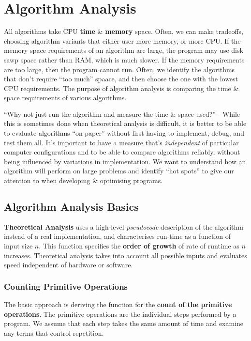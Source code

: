 \documentclass[11pt]{article}
\begin{document}
\section{Algorithm Analysis}
All algorithms take CPU \textbf{time} \& \textbf{memory} space. 
Often, we can make tradeoffs, choosing algorithm variants that either user more memory, or more CPU. 
If the memory space requirements of an algorithm are large, the program may use disk sawp space rather than RAM, which is much slower. 
If the memory requirements are too large, then the program cannot run. 
Often, we identify the algorithms that don't require ``too much'' spaace, and then choose the one with the lowest 
CPU requirements. 
The purpose of algorithm analysis is comparing the time \& space requirements of various algorithms. 

``Why not just run the algorithm and measure the time \& space used?'' - 
While this is sometimes done when theoretical analysis is difficult, it is better to be able to evaluate 
algorithms ``on paper'' without first having to implement, debug, and test them all.
It's important to have a measure that's \textit{independent} of particular computer configurations and to be able to  
compare algorithms reliably, without being influenced by variations in implementation. 
We want to understand how an algorithm will perform on large problems and identify ``hot spots'' to give our attention 
to when developing \& optimising programs. 

\subsection{Algorithm Analysis Basics}
\textbf{Theoretical Analysis} uses a high-level \textit{pseudocode} description of the algorithm instead of a real 
implementation, and characterises run-time as a function of input size $n$. 
This function specifies the \textbf{order of growth} of rate of runtime as $n$ increases. 
Theoretical analysis takes into account all possible inputs and evaluates speed independent of hardware or software. 

\subsubsection{Counting Primitive Operations}
The basic approach is deriving the function for the \textbf{count of the primitive operations}. 
The primitive operations are the individual steps performed by a program. 
We assume that each step takes the same amount of time and examine any terms that control repetition. 
\end{document}
